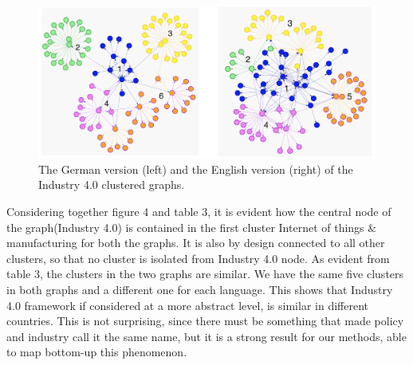\documentclass[]{book}
\begin{document}
\begin{figure}

{\centering \includegraphics[width=1\linewidth]{_bookdown_files/figures/industrie_clusters} 

}

\caption{The German version (left) and the English version (right) of the Industry 4.0 clustered graphs.}\label{fig:industrieclusters}
\end{figure}

Considering together figure 4 and table 3, it is evident how the central
node of the graph(Industry 4.0) is contained in the first cluster
Internet of things \& manufacturing for both the graphs. It is also by
design connected to all other clusters, so that no cluster is isolated
from Industry 4.0 node. As evident from table 3, the clusters in the two
graphs are similar. We have the same five clusters in both graphs and a
different one for each language. This shows that Industry 4.0 framework
if considered at a more abstract level, is similar in different
countries. This is not surprising, since there must be something that
made policy and industry call it the same name, but it is a strong
result for our methods, able to map bottom-up this phenomenon.
\end{document}
